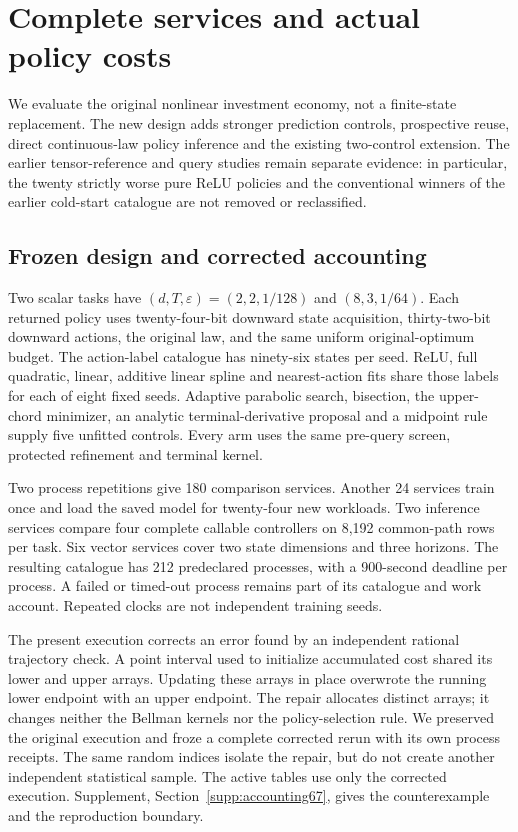 \section{Complete services and actual policy costs}\label{sec:study67}
We evaluate the original nonlinear investment economy, not a finite-state replacement. The new design adds stronger prediction controls, prospective reuse, direct continuous-law policy inference and the existing two-control extension. The earlier tensor-reference and query studies remain separate evidence: in particular, the twenty strictly worse pure ReLU policies and the conventional winners of the earlier cold-start catalogue are not removed or reclassified.

\subsection{Frozen design and corrected accounting}
Two scalar tasks have $(d,T,\varepsilon)=(2,2,1/128)$ and $(8,3,1/64)$. Each returned policy uses twenty-four-bit downward state acquisition, thirty-two-bit downward actions, the original law, and the same uniform original-optimum budget. The action-label catalogue has ninety-six states per seed. ReLU, full quadratic, linear, additive linear spline and nearest-action fits share those labels for each of eight fixed seeds. Adaptive parabolic search, bisection, the upper-chord minimizer, an analytic terminal-derivative proposal and a midpoint rule supply five unfitted controls. Every arm uses the same pre-query screen, protected refinement and terminal kernel.

Two process repetitions give 180 comparison services. Another 24 services train once and load the saved model for twenty-four new workloads. Two inference services compare four complete callable controllers on 8,192 common-path rows per task. Six vector services cover two state dimensions and three horizons. The resulting catalogue has 212 predeclared processes, with a 900-second deadline per process. A failed or timed-out process remains part of its catalogue and work account. Repeated clocks are not independent training seeds.

The present execution corrects an error found by an independent rational trajectory check. A point interval used to initialize accumulated cost shared its lower and upper arrays. Updating these arrays in place overwrote the running lower endpoint with an upper endpoint. The repair allocates distinct arrays; it changes neither the Bellman kernels nor the policy-selection rule. We preserved the original execution and froze a complete corrected rerun with its own process receipts. The same random indices isolate the repair, but do not create another independent statistical sample. The active tables use only the corrected execution. Supplement, Section~\ref{supp:accounting67}, gives the counterexample and the reproduction boundary.

